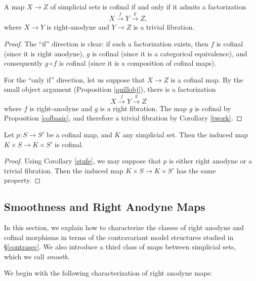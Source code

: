 \begin{corollary}\label{stufe}
A map $X \rightarrow Z$ of simplicial sets is cofinal if and only
if it admits a factorization $$X \stackrel{f}{\rightarrow} Y
\stackrel{g}{\rightarrow} Z,$$ where $X \rightarrow Y$ is
right-anodyne and $Y \rightarrow Z$ is a trivial fibration.
\end{corollary}

\begin{proof}
The ``if'' direction is clear: if such a factorization exists,
then $f$ is cofinal (since it is right anodyne), $g$ is cofinal
(since it is a categorical equivalence), and consequently $g \circ
f$ is cofinal (since it is a composition of cofinal maps).

For the ``only if'' direction, let us suppose that $X \rightarrow
Z$ is a cofinal map. By the small object argument (Proposition \ref{quillobj}), there is a
factorization $$X \stackrel{f}{\rightarrow} Y
\stackrel{g}{\rightarrow} Z$$ where $f$ is right-anodyne and $g$
is a right fibration. The map $g$ is cofinal by Proposition \ref{cofbasic}, and therefore a trivial fibration by Corollary \ref{twork}.
\end{proof}

\begin{corollary}\label{prodcofinal}
Let $p: S \rightarrow S'$ be a cofinal map, and $K$ any simplicial
set. Then the induced map $K \times S \rightarrow K \times S'$ is
cofinal.
\end{corollary}

\begin{proof}
Using Corollary \ref{stufe}, we may suppose that $p$ is either
right anodyne or a trivial fibration. Then the induced map $K \times S \rightarrow K \times S'$ has the same property.
\end{proof}

\subsection{Smoothness and Right Anodyne Maps}\label{smoothness}

In this section, we explain how to characterize the classes of right anodyne and cofinal morphisms in terms of the contravariant model structures studied in \S \ref{contrasec}. We also introduce a third class of maps between simplicial sets, which we call {\it smooth}.

We begin with the following characterization of right anodyne maps:

